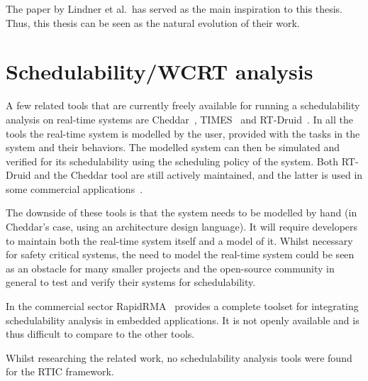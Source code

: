 The paper by Lindner et al.\ has served as the main inspiration to this thesis.
Thus, this thesis can be seen as the natural evolution of their work.

\section{Schedulability/WCRT analysis}
A few related tools that are currently freely available for running a
schedulability analysis on real-time systems are Cheddar~\cite{cheddar},
TIMES~\cite{timestool} and RT-Druid~\cite{rtdruid}. In all the tools the
real-time system is modelled by the user, provided with the tasks in the system
and their behaviors. The modelled system can then be simulated and verified
for its schedulability using the scheduling policy of the system. Both RT-Druid
and the Cheddar tool are still actively maintained, and the latter is used in
some commercial applications~\cite{ellidiss}.

The downside of these tools is that the system needs to be modelled by hand
(in Cheddar's case, using an architecture design language). It will require
developers to maintain both the real-time system itself and a model of it.
Whilst necessary for safety critical systems, the need to model the real-time
system could be seen as an obstacle for many smaller projects and the
open-source community in general to test and verify their systems for
schedulability.

In the commercial sector RapidRMA~\cite{rapidrma} provides a complete toolset
for integrating schedulability analysis in embedded applications. It is not
openly available and is thus difficult to compare to the other tools.

Whilst researching the related work, no schedulability analysis tools were
found for the RTIC framework.

